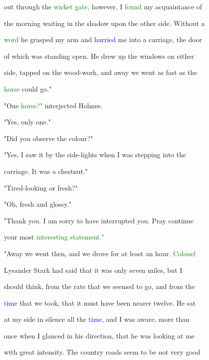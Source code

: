  out through the \textcolor{green}{wicket} \textcolor{green}{gate,} however, I \textcolor{green}{found} my acquaintance of

 the morning \textcolor{BurntOrange}{waiting} in the shadow upon the other side. Without a

 \textcolor{green}{word} he grasped my arm and \textcolor{blue}{hurried} me into a carriage, the door

 of which was standing open. He drew up the windows on either

 side, tapped on the wood-work, and away we went as fast as the

 \textcolor{green}{horse} could go."



 "One \textcolor{green}{horse?"} interjected Holmes.



 "Yes, only one."



 "Did you observe the colour?"



 "Yes, I saw it by the side-lights when I was stepping into the

 carriage. It was a chestnut."



 "Tired-looking or fresh?"



 "Oh, fresh and glossy."



 "Thank you. I am sorry to have \textcolor{BurntOrange}{interrupted} you. \textcolor{BurntOrange}{Pray} \textcolor{BurntOrange}{continue}

 your most \textcolor{green}{interesting} \textcolor{green}{statement."}



 "Away we went then, and we drove for at least an hour. \textcolor{green}{Colonel}

 Lysander \textcolor{BurntOrange}{Stark} had said that it was only seven miles, but I

 should think, from the rate that we seemed to go, and from the

 \textcolor{blue}{time} that we took, that it must have been nearer twelve. He sat

 at my side in silence all the \textcolor{blue}{time,} and I was aware, more than

 once when I glanced in his direction, that he was looking at me

 with great intensity. The country roads seem to be not very \textcolor{BurntOrange}{good}

